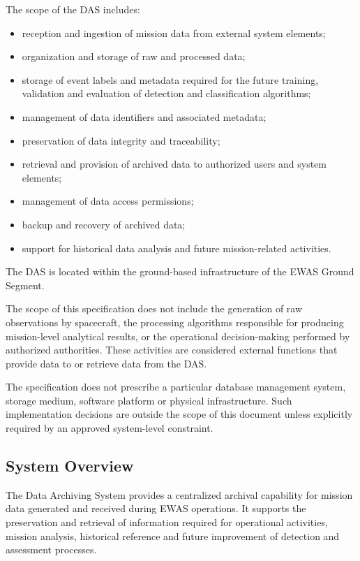 The scope of the DAS includes:

\begin{itemize}
    \item reception and ingestion of mission data from external system elements;
    \item organization and storage of raw and processed data;
    \item storage of event labels and metadata required for the future training, validation and evaluation of detection and classification algorithms;
    \item management of data identifiers and associated metadata;
    \item preservation of data integrity and traceability;
    \item retrieval and provision of archived data to authorized users and system elements;
    \item management of data access permissions;
    \item backup and recovery of archived data;
    \item support for historical data analysis and future mission-related activities.
\end{itemize}

The DAS is located within the ground-based infrastructure of the EWAS Ground Segment.

The scope of this specification does not include the generation of raw observations by spacecraft, the processing algorithms responsible for producing mission-level analytical results, or the operational decision-making performed by authorized authorities. These activities are considered external functions that provide data to or retrieve data from the DAS.

The specification does not prescribe a particular database management system, storage medium, software platform or physical infrastructure. Such implementation decisions are outside the scope of this document unless explicitly required by an approved system-level constraint.

\subsection{System Overview}

The Data Archiving System provides a centralized archival capability for mission data generated and received during EWAS operations. It supports the preservation and retrieval of information required for operational activities, mission analysis, historical reference and future improvement of detection and assessment processes.

